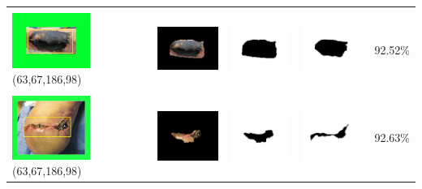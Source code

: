 \begin{table}[H]
\begin{tabular}{|m{1.0in}|m{1.0in}|m{1.0in}|m{1.0in}|m{0.6in}|}
		&  &  & \\
		\includegraphics[width=1.0in]{gambar/hasil_segmentasi/luka_hitam/image_22_rect.jpg} {\centering\fontsize{10}{10}\selectfont(63,67,186,98)}&
		\includegraphics[width=1.0in]{gambar/hasil_segmentasi/luka_hitam/result_22.jpg}&
		\includegraphics[width=1.0in]{gambar/hasil_segmentasi/luka_hitam/mask_r_22.jpg}&
		\includegraphics[width=1.0in]{gambar/hasil_segmentasi/luka_hitam/22_r.jpg}&
		92.52\% \\
		\hline 

		&  &  & \\
		\includegraphics[width=1.0in]{gambar/hasil_segmentasi/luka_hitam/image_16_rect.jpg} {\centering\fontsize{10}{10}\selectfont(63,67,186,98)}&
		\includegraphics[width=1.0in]{gambar/hasil_segmentasi/luka_hitam/result_16.jpg}&
		\includegraphics[width=1.0in]{gambar/hasil_segmentasi/luka_hitam/mask_r_16.jpg}&
		\includegraphics[width=1.0in]{gambar/hasil_segmentasi/luka_hitam/16_r.jpg}&
		92.63\% \\
		\hline 

	\end{tabular}
\end{table}

